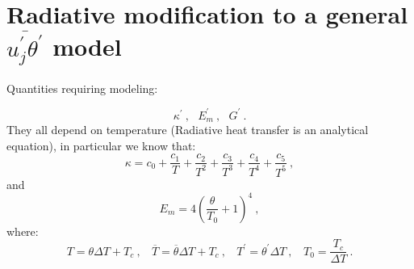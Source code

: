 \documentclass[10pt]{article}
\def\lp{\left(}
\def\rp{\right)}
\def\tm{\overline{\theta}}
\def\tr{{\theta^\prime}}
\begin{document}
\section*{Radiative modification to a general $\overline{u_j^\prime \tr}$ model}
\vspace{1cm}
Quantities requiring modeling:

\begin{equation*}
\kappa^\prime \ , \ \ \ E_m^\prime \ , \ \ \ G^\prime \ .
\end{equation*}
They all depend on temperature (Radiative heat transfer is an analytical equation), in particular we know that:
\begin{equation*}
\kappa = c_0 + \frac{c_1}{T} + \frac{c_2}{T^2} + \frac{c_3}{T^3} + \frac{c_4}{T^4} + \frac{c_5}{T^5} \ ,
\end{equation*}
and
\begin{equation*}
E_m = 4 {\lp \frac{\theta}{T_0} + 1\rp }^4 \ ,
\end{equation*}
where:
\begin{equation*}
T = \theta \Delta T + T_c \ ,  \ \ \ \ \overline{T} = \tm \Delta T+ T_c \ , \ \ \ \ T^\prime = \tr \Delta T \ , \ \ \ \ T_0 = \frac{T_c}{\Delta T} \ .
\end{equation*}
\end{document}
